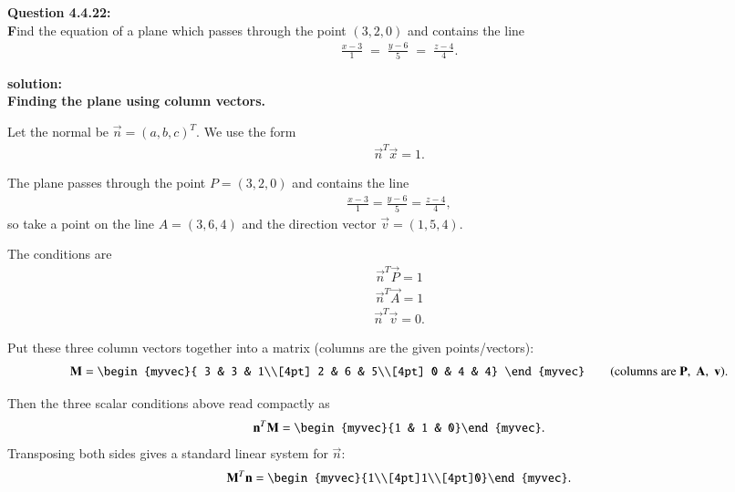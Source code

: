 \documentclass[journal]{IEEEtran}
\begin{document}



\textbf{Question 4.4.22:} \\
 \textbf Find the equation of a plane which passes through the point $(3,2,0)$ and contains the line
\begin{align}
\frac{x-3}{1} \;=\; \frac{y-6}{5} \;=\; \frac{z-4}{4}.
\end{align}

\textbf{solution:}\\
\textbf{Finding the plane using column vectors.}

Let the normal be \(\vec{n}=(a,b,c)^T\). We use the form
\begin{align}
\vec{n}^T\vec{x}=1.
\end{align}

The plane passes through the point \(P=(3,2,0)\) and contains the line
\begin{align}
\frac{x-3}{1}=\frac{y-6}{5}=\frac{z-4}{4},
\end{align}
so take a point on the line \(A=(3,6,4)\) and the direction vector
\(\vec{v}=(1,5,4)\).

The conditions are
\begin{align}
\vec{n}^T\vec{P} = 1
\end{align}
\begin{align}
\vec{n}^T \vec{A} = 1
\end{align}
\begin{align}
\vec{n}^T \vec{v} = 0.
\end{align}

Put these three column vectors together into a matrix (columns are the given points/vectors):
\begin{align}
\vec{M}=\begin{myvec}{
3 & 3 & 1\\[4pt]
2 & 6 & 5\\[4pt]
0 & 4 & 4}
\end{myvec}
\qquad\text{(columns are }\vec{P},\;\vec{A},\;\vec{v}\text{).}
\end{align}

Then the three scalar conditions above read compactly as
\begin{align}
\vec{n}^T\vec{M} = \begin{myvec}{1 & 1 & 0}\end{myvec}.
\end{align}
Transposing both sides gives a standard linear system for \(\vec{n}\):
\begin{align}
\vec{M}^T \vec{n} = \begin{myvec}{1\\[4pt]1\\[4pt]0}\end{myvec}.
\end{align}
\end{document}
